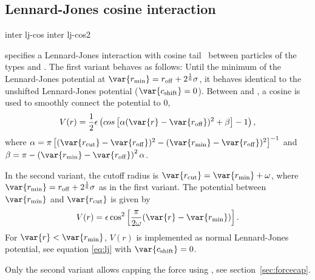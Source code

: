 \subsection{Lennard-Jones cosine interaction}
\begin{essyntax}
  inter   lj-cos
  \var{\epsilon} \var{\sigma}
   
  inter   lj-cos2
  \var{\epsilon} \var{\sigma} 
   \var{\omega}
  \begin{features}
  \end{features}
\end{essyntax}
specifies a Lennard-Jones interaction with cosine
tail~\cite{soddeman01a} between particles of the types  and
. The first variant behaves as follows: Until the minimum
of the Lennard-Jones potential at $\var{r_\mathrm{min}} = r_\mathrm{off} +
2^{\frac{1}{6}}\sigma$, it behaves identical to the unshifted
Lennard-Jones potential ($\var{c_\mathrm{shift}}=0$).  Between
 and , a cosine is used to
smoothly connect the potential to 0, \ie
\begin{equation}
  V(r)=\frac{1}{2}\epsilon\left(cos\left[\alpha(\var{r}-\var{r_\mathrm{off}})^2 + \beta\right]-1\right),
\end{equation}
where
$\alpha = \pi\left[(\var{r_\mathrm{cut}}-\var{r_\mathrm{off}})^2-(\var{r_\mathrm{min}}-\var{r_\mathrm{off}})^2\right]^{-1}$
and
$\beta = \pi - \left(\var{r_\mathrm{min}}-\var{r_\mathrm{off}}\right)^2\alpha$.

In the second variant, the cutoff radius is
$\var{r_\mathrm{cut}}=\var{r_\mathrm{min}} + \omega$, where $\var{r_\mathrm{min}} =  r_\mathrm{off} +
2^{\frac{1}{6}}\sigma$ as in the first variant. The potential
between $\var{r_\mathrm{min}}$ and $\var{r_\mathrm{cut}}$ is given by
\begin{equation}
  V(r)=\epsilon\cos^2\left[\frac{\pi}{2\omega}(\var{r} - \var{r_\mathrm{min}})\right].
\end{equation}
For $\var{r} < \var{r_\mathrm{min}}$, $V(r)$ is implemented as normal
Lennard-Jones potential, see equation \ref{eq:lj} with
$\var{c_\mathrm{shift}} = 0$.

Only the second variant allows capping the force using , see section~\ref{sec:forcecap}.

